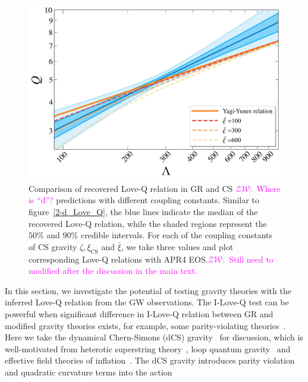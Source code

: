 \documentclass[a4paper,11pt]{article}
\newcommand{\ZW}[1]{\textcolor{magenta}{$\mathcal{ZW}$:~#1}}
\begin{document}
\begin{figure}[t]
\begin{minipage}{0.48\linewidth}
    \end{minipage}
    \vspace{3mm}
    \begin{minipage}{0.48\linewidth}
        \includegraphics[width=\linewidth]{CS_xi_bar_APR4_2d.pdf}
    \end{minipage}
    \caption{Comparison of recovered Love-Q relation in GR
    and CS \ZW{Where is ``d''?} predictions 
    with different coupling constants. Similar to figure~\ref{2-d_Love_Q}, the
    blue lines indicate the median of the recovered Love-Q relation, while the
    shaded regions represent the $50\%$ and $90\%$ credible intervals. For each of the coupling constants of 
    CS gravity $\zeta, \xi_{\mathrm{CS}}$ and $\bar\xi$, we take three values
    and plot corresponding Love-Q relations with APR4 EOS.\ZW{Still need to
    modified after the discussion in the main text.}}
    \label{cs_Love_Q}
\end{figure}
In this section, we investigate the potential of testing gravity theories with the 
inferred Love-Q relation from the GW observations. The I-Love-Q test can be 
powerful when significant difference in I-Love-Q relation between GR and modified 
gravity theories exists, for example, some parity-violating theories~\cite{Yagi_2017, Yunes:2025xwp}. 
Here we take the dynamical Chern-Simons (dCS) gravity~\cite{Jackiw:2003pm, Smith:2007jm,Alexander:2009tp} for discussion, 
which is well-motivated from heterotic superstring theory~\cite{Polchinski:1998rq,
Polchinski:1998rr}, loop quantum gravity~\cite{Alexander:2004xd,Taveras:2008yf,
Calcagni:2009xz} and effective field theories of inflation~\cite{Weinberg:2008hq}. 
The dCS gravity introduces parity violation and quadratic curvature terms into the action~\cite{Alexander:2009tp,Gupta:2017vsl}
\end{document}
